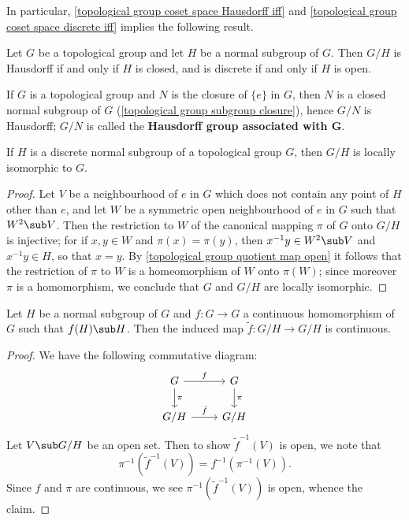 In particular, \cref{topological group coset space Hausdorff iff} and \cref{topological group coset space discrete iff} implies the following result.
\begin{proposition}\label{topological group quotient group Hausdorff or discrete iff}
Let $G$ be a topological group and let $H$ be a normal subgroup of $G$. Then $G/H$ is Hausdorff if and only if $H$ is closed, and is discrete if and only if $H$ is open.
\end{proposition}
If $G$ is a topological group and $N$ is the closure of $\{e\}$ in $G$, then $N$ is a closed normal subgroup of $G$ (\cref{topological group subgroup closure}), hence $G/N$ is Hausdorff; $G/N$ is called the \textbf{Hausdorff group associated with $\bm{G}$}.
\begin{proposition}\label{topological group quotient by discrete normal}
If $H$ is a discrete normal subgroup of a topological group $G$, then $G/H$ is locally isomorphic to $G$.
\end{proposition}
\begin{proof}
Let $V$ be a neighbourhood of $e$ in $G$ which does not contain any point of $H$ other than $e$, and let $W$ be a symmetric open neighbourhood of $e$ in $G$ such that $W^2\sub V$. Then the restriction to $W$ of the canonical mapping $\pi$ of $G$ onto $G/H$ is injective; for if $x,y\in W$ and $\pi(x)=\pi(y)$, then $x^{-1}y\in W^2\sub V$ and $x^{-1}y\in H$, so that $x=y$. By \cref{topological group quotient map open} it follows that the restriction of $\pi$ to $W$ is a homeomorphism of $W$ onto $\pi(W)$; since moreover $\pi$ is a homomorphism, we conclude that $G$ and $G/H$ are locally isomorphic.
\end{proof}
\begin{proposition}\label{topological group induced map on quotient continuous}
Let $H$ be a normal subgroup of $G$ and $f:G\to G$ a continuous homomorphism of $G$ such that $f(H)\sub H$. Then the induced map $\tilde{f}:G/H\to G/H$ is continuous.
\end{proposition}
\begin{proof}
We have the following commutative diagram:
\[\begin{tikzcd}
G\ar[d,"\pi"]\ar[r,"f"]&G\ar[d,"\pi"]\\
G/H\ar[r,"\tilde{f}"]&G/H
\end{tikzcd}\]
Let $V\sub G/H$ be an open set. Then to show $\tilde{f}^{-1}(V)$ is open, we note that
\[\pi^{-1}(\tilde{f}^{-1}(V))=f^{-1}(\pi^{-1}(V)).\]
Since $f$ and $\pi$ are continuous, we see $\pi^{-1}(\tilde{f}^{-1}(V))$ is open, whence the claim.
\end{proof}
